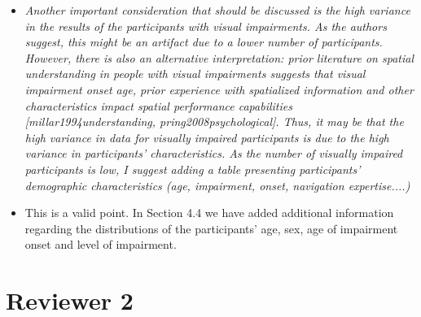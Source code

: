 \documentclass{scrartcl}
\begin{document}
\begin{itemize}
  \item \textit{Another important consideration that should be discussed is the high variance in the results of the participants with visual impairments. As the authors suggest, this might be an artifact due to a lower number of participants. However, there is also an alternative interpretation: prior literature on spatial understanding in people with visual impairments suggests that visual impairment onset age, prior experience with spatialized information and other characteristics impact spatial performance capabilities [millar1994understanding, pring2008psychological]. Thus, it may be that the high variance in data for visually impaired participants is due to the high variance in participants' characteristics. As the number of visually impaired participants is low, I suggest adding a table presenting participants' demographic characteristics (age, impairment, onset, navigation expertise....)}
  \item[] This is a valid point. In Section 4.4 we have added additional information regarding the distributions of the participants' age, sex, age of impairment onset and level of impairment.
\end{itemize}

\section*{Reviewer 2}
\end{document}
